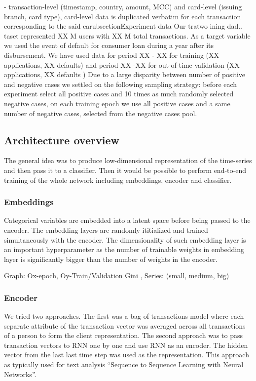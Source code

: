 \documentclass{sigkddExp}
\begin{document}
\scategories - transaction-level (timestamp, country, amount, MCC) and card-level (issuing branch, card type), card-level data is duplicated verbatim for each transaction corresponding to the said carubsection{Experiment data}
Our tratwo ining dad.. taset represented XX M  users with XX M total transactions. As a target variable we used the event of default for consumer loan during a year after its disbursement. 
We have used data for period XX - XX for training  (XX applications, XX defaults) and period XX -XX for out-of-time validation (XX applications, XX defaults ) Due to a large disparity between number of positive and negative cases we settled on the following sampling strategy: before each experiment select all positive cases and 10 times as much randomly selected negative cases, on each training epoch we use all positive cases and a same number of negative cases, selected from the negative cases pool.  

\subsection{Architecture overview}
The general idea was to produce low-dimensional representation of the time-series and then pass it to a classifier. Then it would be possible to perform end-to-end training of the whole network including embeddings, encoder and classifier.

\subsubsection{Embeddings}

Categorical variables are embedded into a latent space before being passed to the encoder. The embedding layers are randomly ititialized and trained simultaneously with the encoder.
The dimensionality of such embedding layer is an important hyperparameter as the number of trainable weights in embedding layer is significantly bigger than the number of weights in the encoder.  

Graph: Ox-epoch, Oy-Train/Validation Gini , Series: (small, medium, big)

\subsubsection{Encoder}

We tried two approaches. The first was a bag-of-transactions model where each separate attribute of the transaction vector was averaged across all transactions of a person to form the client representation. The second approach was to pass transaction vectors to RNN one by one and use RNN as an encoder. The hidden vector from the last last time step was used as the representation. This approach as typically used for text analysis “Sequence to Sequence Learning with Neural Networks”\cite{NIPS2014_5346}.
\end{document}
